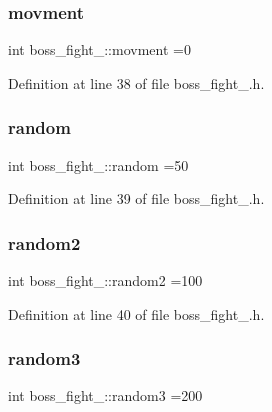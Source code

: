 \hypertarget{classboss__fight__3_abe87612260269ddeee353b88954a2368}{}\label{classboss__fight__3_abe87612260269ddeee353b88954a2368} 
\subsubsection{\texorpdfstring{movment}{movment}}
{\footnotesize\ttfamily int boss\+\_\+fight\+\_\+::movment =0}



Definition at line 38 of file boss\+\_\+fight\+\_.\+h.

\hypertarget{classboss__fight__3_a7e5ef868637491ac49e34968532c1706}{}\label{classboss__fight__3_a7e5ef868637491ac49e34968532c1706} 
\subsubsection{\texorpdfstring{random}{random}}
{\footnotesize\ttfamily int boss\+\_\+fight\+\_\+::random =50}



Definition at line 39 of file boss\+\_\+fight\+\_.\+h.

\hypertarget{classboss__fight__3_aa65054f06ce0fc4faefa43054656503f}{}\label{classboss__fight__3_aa65054f06ce0fc4faefa43054656503f} 
\subsubsection{\texorpdfstring{random2}{random2}}
{\footnotesize\ttfamily int boss\+\_\+fight\+\_\+::random2 =100}



Definition at line 40 of file boss\+\_\+fight\+\_.\+h.

\hypertarget{classboss__fight__3_a20c2d1c9079b2326ae287a78d17934c0}{}\label{classboss__fight__3_a20c2d1c9079b2326ae287a78d17934c0} 
\subsubsection{\texorpdfstring{random3}{random3}}
{\footnotesize\ttfamily int boss\+\_\+fight\+\_\+::random3 =200}



